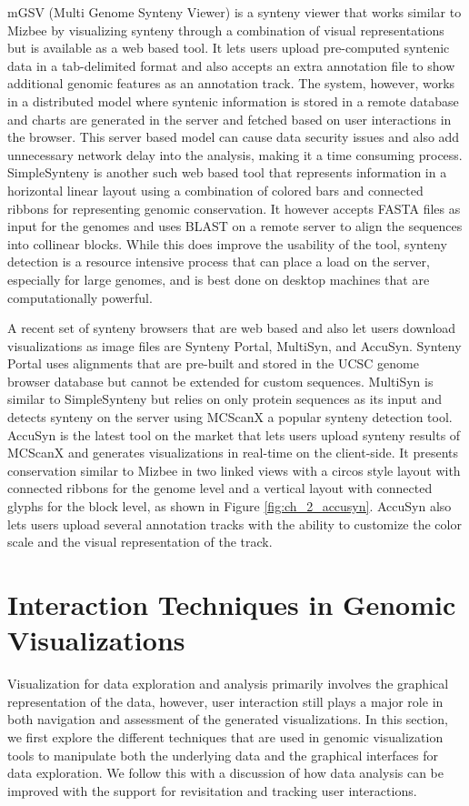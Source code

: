 mGSV (Multi Genome Synteny Viewer) is a synteny viewer that works similar to Mizbee by visualizing synteny through a combination of visual representations but is available as a web based tool\cite{revanna2011gsv}. It lets users upload pre-computed syntenic data in a tab-delimited format and also accepts an extra annotation file to show additional genomic features as an annotation track. The system, however, works in a distributed model where syntenic information is stored in a remote database and charts are generated in the server and fetched based on user interactions in the browser. This server based model can cause data security issues and also add unnecessary network delay into the analysis, making it a time consuming process. SimpleSynteny is another such web based tool that represents information in a horizontal linear layout using a combination of colored bars and connected ribbons for representing genomic conservation\cite{veltri2016simplesynteny}. It however accepts FASTA files as input for the genomes and uses BLAST\cite{blasttool} on a remote server to align the sequences into collinear blocks. While this does improve the usability of the tool, synteny detection is a resource intensive process that can place a load on the server, especially for large genomes, and is best done on desktop machines that are computationally powerful.

A recent set of synteny browsers that are web based and also let users download visualizations as image files are Synteny Portal, MultiSyn, and AccuSyn. Synteny Portal uses alignments that are pre-built and stored in the UCSC genome browser database but cannot be extended for custom sequences\cite{lee2016syntenyportal}. MultiSyn\cite{baek2016multisyn} is similar to SimpleSynteny but relies on only protein sequences as its input and detects synteny on the server using MCScanX\cite{wang2012mcscanx} a popular synteny detection tool. AccuSyn\cite{accusyn} is the latest tool on the market that lets users upload synteny results of MCScanX and generates visualizations in real-time on the client-side. It presents conservation similar to Mizbee in two linked views with a circos style layout with connected ribbons for the genome level and a vertical layout with connected glyphs for the block level, as shown in Figure \ref{fig:ch_2_accusyn}. AccuSyn also lets users upload several annotation tracks with the ability to customize the color scale and the visual representation of the track.

\section{Interaction Techniques in Genomic Visualizations}
Visualization for data exploration and analysis primarily involves the graphical representation of the data, however, user interaction still plays a major role in both navigation and assessment of the generated visualizations.  In this section, we first explore the different techniques that are used in genomic visualization tools to manipulate both the underlying data and the graphical interfaces for data exploration. We follow this with a discussion of how data analysis can be improved with the support for revisitation and tracking user interactions.

